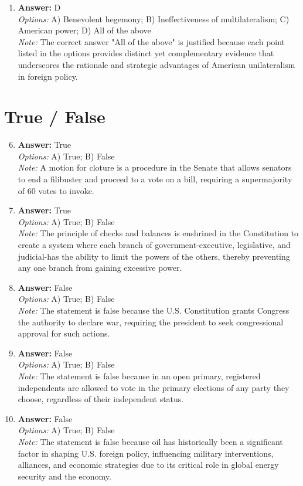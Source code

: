 \documentclass[12pt]{article}
\begin{document}
\begin{enumerate}[label=\arabic*.]
\\ \textit{Note:} The Supreme Court has ruled that the death penalty can be constitutional under certain conditions, provided it does not constitute cruel and unusual punishment as prohibited by the Eighth Amendment.
\item \textbf{Answer:} D
\\ \textit{Options:} A) Benevolent hegemony; B) Ineffectiveness of multilateralism; C) American power; D) All of the above
\\ \textit{Note:} The correct answer "All of the above" is justified because each point listed in the options provides distinct yet complementary evidence that underscores the rationale and strategic advantages of American unilateralism in foreign policy.
\end{enumerate}

\section*{True / False}
\begin{enumerate}[label=\arabic*.]
\setcounter{enumi}{5}
\item \textbf{Answer:} True
\\ \textit{Options:} A) True; B) False
\\ \textit{Note:} A motion for cloture is a procedure in the Senate that allows senators to end a filibuster and proceed to a vote on a bill, requiring a supermajority of 60 votes to invoke.
\item \textbf{Answer:} True
\\ \textit{Options:} A) True; B) False
\\ \textit{Note:} The principle of checks and balances is enshrined in the Constitution to create a system where each branch of government-executive, legislative, and judicial-has the ability to limit the powers of the others, thereby preventing any one branch from gaining excessive power.
\item \textbf{Answer:} False
\\ \textit{Options:} A) True; B) False
\\ \textit{Note:} The statement is false because the U.S. Constitution grants Congress the authority to declare war, requiring the president to seek congressional approval for such actions.
\item \textbf{Answer:} False
\\ \textit{Options:} A) True; B) False
\\ \textit{Note:} The statement is false because in an open primary, registered independents are allowed to vote in the primary elections of any party they choose, regardless of their independent status.
\item \textbf{Answer:} False
\\ \textit{Options:} A) True; B) False
\\ \textit{Note:} The statement is false because oil has historically been a significant factor in shaping U.S. foreign policy, influencing military interventions, alliances, and economic strategies due to its critical role in global energy security and the economy.
\end{enumerate}
\end{document}
